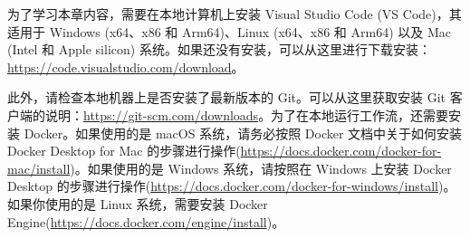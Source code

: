 为了学习本章内容，需要在本地计算机上安装 Visual Studio Code (VS Code)，其适用于 Windows (x64、x86 和 Arm64)、Linux (x64、x86 和 Arm64) 以及 Mac (Intel 和 Apple silicon) 系统。如果还没有安装，可以从这里进行下载安装：\url{https://code.visualstudio.com/download}。

此外，请检查本地机器上是否安装了最新版本的 Git。可以从这里获取安装 Git 客户端的说明：\url{https://git-scm.com/downloads}。为了在本地运行工作流，还需要安装 Docker。如果使用的是 macOS 系统，请务必按照 Docker 文档中关于如何安装 Docker Desktop for Mac 的步骤进行操作(\url{https://docs.docker.com/docker-for-mac/install})。如果使用的是 Windows 系统，请按照在 Windows 上安装 Docker Desktop 的步骤进行操作(\url{https://docs.docker.com/docker-for-windows/install})。如果你使用的是 Linux 系统，需要安装 Docker Engine(\url{https://docs.docker.com/engine/install})。